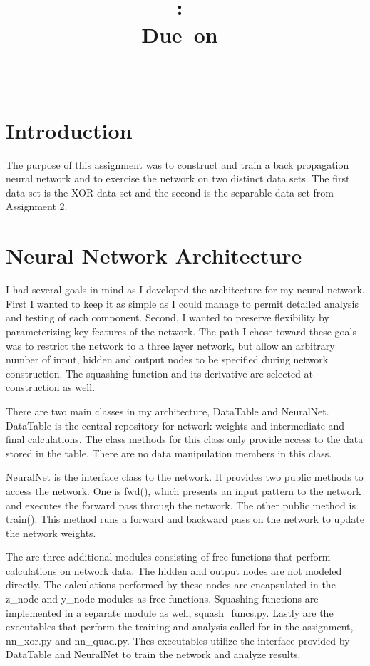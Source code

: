 \documentclass{article}
\title{\vspace{2in}\textmd{\textbf{\hmwkClass:\ \hmwkTitle\ifthenelse{\equal{\hmwkSubTitle}{}}{}{\\\hmwkSubTitle}}}\\\normalsize\vspace{0.1in}\small{Due\ on\ \hmwkDueDate}\\\vspace{0.1in}\large{\textit{\hmwkClassInstructor\ \hmwkClassTime}}\vspace{3in}}
\date{}
\author{\textbf{\hmwkAuthorName}}
\begin{document}
\maketitle

\section*{Introduction}
The purpose of this assignment was to construct and train a back
propagation neural network and to exercise the network on two distinct
data sets.  The first data set is the XOR data set and the second is
the separable data set from Assignment 2.

\section*{Neural Network Architecture}
I had several goals in mind as I developed the architecture for my
neural network.  First I wanted to keep it as simple as I could manage
to permit detailed analysis and testing of each component.  Second, I
wanted to preserve flexibility by parameterizing key features of the
network.  The path I chose toward these goals was to restrict the
network to a three layer network, but allow an arbitrary number of
input, hidden and output nodes to be specified during network
construction. The squashing function and its derivative are selected
at construction as well.

There are two main classes in my architecture, DataTable and
NeuralNet. DataTable is the central repository for network weights and
intermediate and final calculations.  The class methods for this class
only provide access to the data stored in the table. There are no data
manipulation members in this class.

NeuralNet is the interface class to the network.  It provides two
public methods to access the network.  One is fwd(), which presents an
input pattern to the network and executes the forward pass through the
network. The other public method is train().  This method runs a
forward and backward pass on the network to update the network
weights.

The are three additional modules consisting of free functions that
perform calculations on network data.  The hidden and output nodes are
not modeled directly.  The calculations performed by these nodes are
encapsulated in the z\_node and y\_node modules as free functions.
Squashing functions are implemented in a separate module as well,
squash\_funcs.py.  Lastly are the executables that perform the training
and analysis called for in the assignment, nn\_xor.py and nn\_quad.py.  Thes executables utilize the interface provided by DataTable and NeuralNet to train the network and analyze results.
\end{document}
